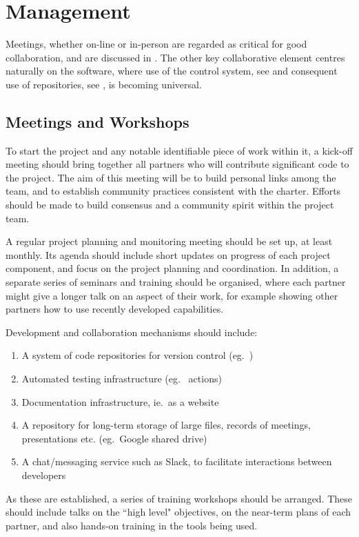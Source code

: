 \section{Management}\label{sec:MGT_MGT}

Meetings, whether on-line or in-person are regarded as critical for good collaboration,
and are discussed in . The other key collaborative element centres
naturally on the software, where use of the  control system, see 
and consequent use of repositories, see , is becoming universal.

\subsection{Meetings and Workshops} \label{sec:meet}

To start the project and any notable identifiable piece of work
within it, a kick-off meeting should bring
together all partners who will contribute significant code to the
project.  The aim of this meeting will be to build personal links
among the team, and to establish community practices consistent with the charter.
Efforts should be made to build consensus and
a community spirit within the project team.

A regular project planning and monitoring meeting should be set up,
at least monthly. Its agenda should include short updates on progress of
each project component, and focus on the project planning and
coordination. In addition, a separate series of seminars and training
should be organised, where each partner might give a longer talk on an
aspect of their work, for example showing other partners how to use
recently developed capabilities.


Development and collaboration mechanisms should include:
\begin{enumerate}
\item A system of code repositories for version control (eg.\ )
\item Automated testing infrastructure (eg.\  actions)
\item Documentation infrastructure, ie.\ as a website
\item A repository for long-term storage of large files, records of
meetings, presentations etc. (eg.\ Google shared drive)
\item A chat/messaging service such as Slack, to facilitate interactions
between developers
\end{enumerate}
As these are established, a series of training workshops should be
arranged. These should include talks on the ``high level" objectives, 
on the near-term plans of each partner, and also hands-on training in
the tools being used. 



